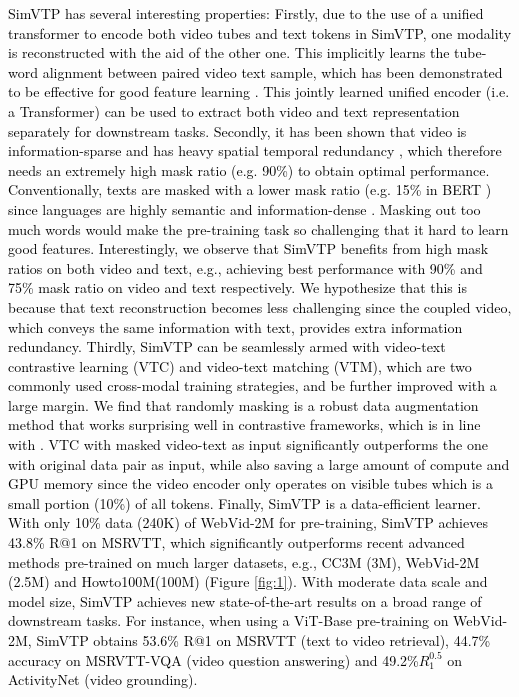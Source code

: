 \documentclass[10pt,twocolumn,letterpaper]{article}
\newcommand{\yty}[1]{\textcolor{black}{#1}}
\begin{document}
\yty{SimVTP has several interesting properties: 
	Firstly, due to the use of a unified transformer to encode both video tubes and text tokens in SimVTP,  one modality is reconstructed with the aid of the other one. This implicitly learns the tube-word alignment between paired video text sample, which has been demonstrated to be effective for good feature learning \cite{li2022align, li2021align}.  This jointly learned unified encoder (i.e. a Transformer) can be used to extract both video and text representation separately for downstream tasks. 
	Secondly, it has been shown that video is information-sparse and has heavy spatial temporal redundancy \cite{tong2022videomae}, which therefore needs an extremely high mask ratio (e.g. 90\%) to obtain optimal performance.  Conventionally, texts are masked with a lower mask ratio (e.g. 15\% in BERT \cite{devlin2018bert}) since languages are highly semantic and information-dense \cite{he2022masked}. Masking out too much words would make the pre-training task so challenging that it hard to learn good features. Interestingly, we observe that SimVTP benefits from high mask ratios on both video and text, e.g.,  achieving best performance with 90\% and 75\% mask ratio on video and text respectively. We hypothesize that this is because that text reconstruction becomes less challenging since the coupled video, which conveys the same information with text,  provides extra information redundancy. 
	Thirdly, SimVTP can be seamlessly armed with video-text contrastive learning (VTC) and video-text matching (VTM), which are two commonly used cross-modal training strategies, and be further improved with a large margin. We find that randomly masking is a robust data augmentation method that works surprising well in contrastive frameworks, which is in line with \cite{jing2022masked}. VTC with masked video-text as input significantly outperforms the one with original data pair as input, while also saving a large amount of compute and GPU memory since the video encoder only operates on visible tubes which is a small portion (10\%) of all tokens.
	Finally, SimVTP is a data-efficient learner. With only 10\% data (240K) of WebVid-2M for pre-training, SimVTP achieves 43.8\% R@1 on MSRVTT, which significantly outperforms recent advanced methods\cite{bain2021frozen, wang2022object, cao2022locvtp} pre-trained on much larger datasets, e.g., CC3M (3M), WebVid-2M (2.5M) and Howto100M(100M) (Figure \ref{fig:1}). With moderate data scale and model size, SimVTP achieves new state-of-the-art results on a broad range of downstream tasks. For instance, when using a ViT-Base pre-training on WebVid-2M,  SimVTP obtains 53.6\% R@1 on MSRVTT (text to video retrieval), 44.7\% accuracy on MSRVTT-VQA (video question answering) and 49.2\%$R_1^{0.5}$ on ActivityNet (video grounding)}.
\end{document}
